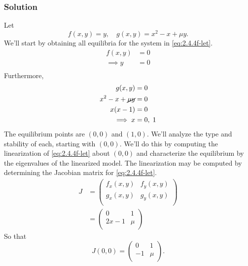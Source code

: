 \documentclass[12pt]{article}
\begin{document}
\subsubsection*{Solution}
Let
\begin{equation}
  \label{eq:2.4.4f-let}
  f(x,y) = y,\quad g(x,y) = x^2-x+\mu y.
\end{equation}
We'll start by obtaining all equilibria for the system in \cref{eq:2.4.4f-let}.
\begin{equation*}
  \begin{aligned}
    f(x,y) &= 0 \\
    \implies y&=0 \\
  \end{aligned}
\end{equation*}
Furthermore,
\begin{equation*}
  \begin{aligned}
    g(x,y) &= 0 \\
    x^2-x+\cancel{\mu y} &= 0 \\
    x(x-1) &= 0 \\
    \implies x &= 0,\;1 \\
  \end{aligned}
\end{equation*}
The equilibrium points are $(0,0)$ and $(1,0)$. We'll analyze the type and
stability of each, starting with $(0,0)$. We'll do this by computing the
linearization of \cref{eq:2.4.4f-let} about $(0,0)$ and characterize the
equilibrium by the eigenvalues of the linearized model. The linearization may be
computed by determining the Jacobian matrix for \cref{eq:2.4.4f-let}.
\begin{equation*}
  \begin{aligned}
    J &= \begin{pmatrix}
    f_x(x,y) & f_y(x,y) \\
    g_x(x,y) & g_y(x,y) \\
  \end{pmatrix} \\
  &=
  \begin{pmatrix}
    0 & 1 \\ 2x-1 & \mu \\
  \end{pmatrix}
  \end{aligned}
\end{equation*}
So that
\begin{equation*}
  J(0,0) =
  \begin{pmatrix}
    0 & 1 \\ -1 & \mu \\
  \end{pmatrix}.
\end{equation*}
\end{document}
